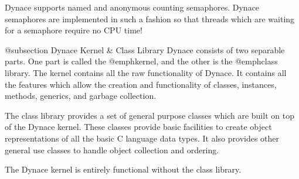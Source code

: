 Dynace supports named and anonymous counting semaphores.  Dynace semaphores
are implemented in such a fashion so that threads which are waiting for
a semaphore require no CPU time!

@subsection Dynace Kernel & Class Library
Dynace consists of two separable parts.  One part is called the @emph{kernel},
and the other is the @emph{class library}.  The kernel contains all the
raw functionality of Dynace.  It contains all the features which allow the
creation and functionality of classes, instances, methods, generics, and
garbage collection.  

The class library provides a set of general purpose classes which are
built on top of the Dynace kernel.  These classes provide basic facilities
to create object representations of all the basic C language data types.
It also provides other general use classes to handle object collection
and ordering.

The Dynace kernel is entirely functional without the class library.

